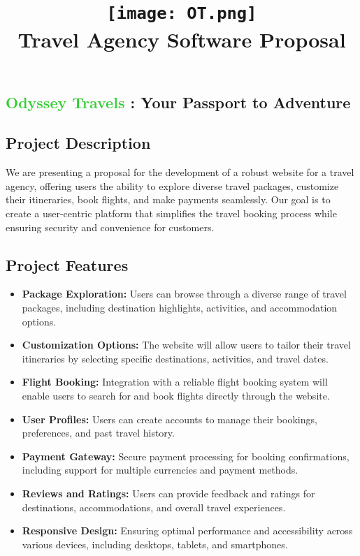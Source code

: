 \documentclass[12pt]{article}
\title{
{\texttt{[image: OT.png]}}
\\
{Travel Agency Software Proposal }
}
\date{}
\begin{document}
\maketitle
\newpage

\begin{center}
\section*{\textcolor [HTML]{32CD32} {Odyssey Travels} : Your Passport to Adventure }
\vspace{10px}
\end{center}
\subsection*{\fontsize{14}{0}\selectfont Project Description }
 We  are presenting a proposal for the development of a robust website for a travel agency, offering users the ability to explore diverse travel packages, customize their itineraries, book flights, and make payments seamlessly. Our goal is to create a user-centric platform that simplifies the travel booking process while ensuring security and convenience for customers.

\subsection*{\fontsize{14}{0}\selectfont Project Features }
\begin{itemize}
    \item \textbf{Package Exploration:} Users can browse through a diverse range of travel packages, including destination highlights, activities, and accommodation options.
    
    \item \textbf{Customization Options:} The website will allow users to tailor their travel itineraries by selecting specific destinations, activities, and travel dates.
    
    \item \textbf{Flight Booking:} Integration with a reliable flight booking system will enable users to search for and book flights directly through the website.
    
    \item \textbf{User Profiles:} Users can create accounts to manage their bookings, preferences, and past travel history.
    
    \item \textbf{Payment Gateway:} Secure payment processing for booking confirmations, including support for multiple currencies and payment methods.
    
    \item \textbf{Reviews and Ratings:} Users can provide feedback and ratings for destinations, accommodations, and overall travel experiences.
    
    \item \textbf{Responsive Design:} Ensuring optimal performance and accessibility across various devices, including desktops, tablets, and smartphones.
\end{itemize}
\end{document}
